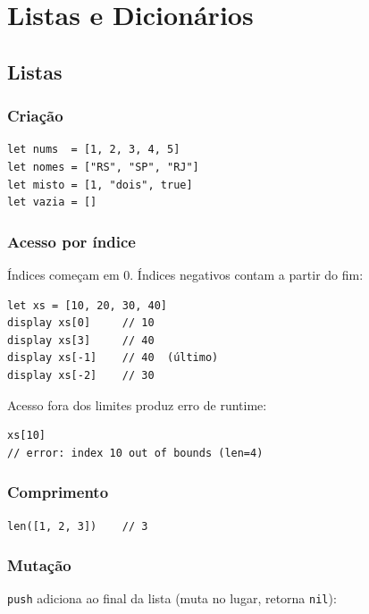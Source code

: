 \chapter{Listas e Dicionários}

\section{Listas}

\subsection{Criação}

\begin{lstlisting}
let nums  = [1, 2, 3, 4, 5]
let nomes = ["RS", "SP", "RJ"]
let misto = [1, "dois", true]
let vazia = []
\end{lstlisting}

\subsection{Acesso por índice}

Índices começam em 0. Índices negativos contam a partir do fim:

\begin{lstlisting}
let xs = [10, 20, 30, 40]
display xs[0]     // 10
display xs[3]     // 40
display xs[-1]    // 40  (último)
display xs[-2]    // 30
\end{lstlisting}

Acesso fora dos limites produz erro de runtime:

\begin{lstlisting}
xs[10]
// error: index 10 out of bounds (len=4)
\end{lstlisting}

\subsection{Comprimento}

\begin{lstlisting}
len([1, 2, 3])    // 3
\end{lstlisting}

\subsection{Mutação}

\lstinline{push} adiciona ao final da lista (muta no lugar, retorna \lstinline{nil}):

